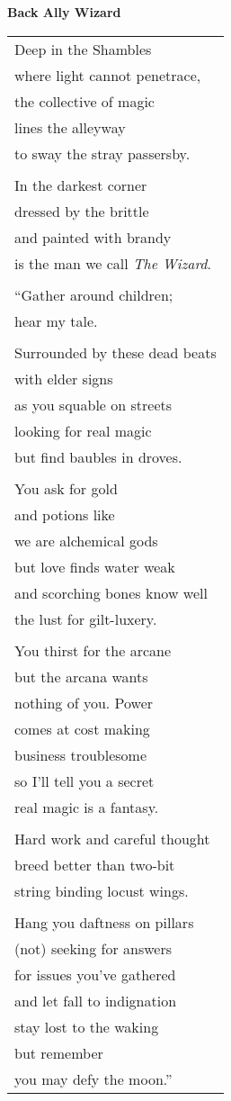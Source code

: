 \documentclass{article}
\begin{document}
\begin{center}
\textbf{Back Ally Wizard} \\
\vspace*{2ex}
\begin{tabular}{l}
Deep in the Shambles \\
where light cannot penetrace, \\
the collective of magic \\
lines the alleyway \\
to sway the stray passersby. \\
\\
In the darkest corner \\
dressed by the brittle \\
and painted with brandy \\
is the man we call \textit{The Wizard}. \\
\\
``Gather around children; \\
hear my tale. \\
\\
Surrounded by these dead beats \\
with elder signs \\
as you squable on streets \\
looking for real magic \\
but find baubles in droves. \\
\\
You ask for gold \\
and potions like \\
we are alchemical gods \\
but love finds water weak \\
and scorching bones know well \\
the lust for gilt-luxery. \\
\\
You thirst for the arcane \\
but the arcana wants \\
nothing of you.  Power \\
comes at cost making \\
business troublesome \\
so I'll tell you a secret \\
real magic is a fantasy. \\
\\
Hard work and careful thought \\
breed better than two-bit \\
string binding locust wings. \\
\\
Hang you daftness on pillars \\
(not) seeking for answers \\
for issues you've gathered \\
and let fall to indignation \\
stay lost to the waking \\
but remember \\
you may defy the moon.'' \\
\end{tabular}
\end{center}
\end{document}
